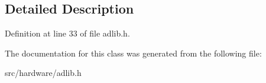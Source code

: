 \subsection{Detailed Description}


Definition at line 33 of file adlib.\-h.



The documentation for this class was generated from the following file\-:\begin{DoxyCompactItemize}
\item 
src/hardware/adlib.\-h\end{DoxyCompactItemize}
